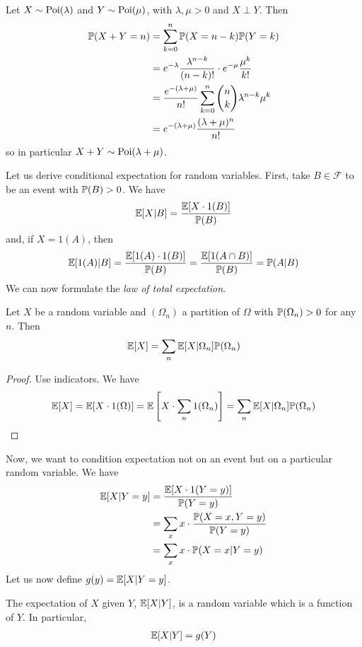 \documentclass{../template/note}
\begin{document}
    \begin{example*}
        Let \(X \sim \operatorname{Poi}(\lambda)\) and \(Y \sim \operatorname{Poi}(\mu)\), with \(\lambda, \mu > 0\) and \(X \perp Y\). Then
        \begin{align*}
            \mathbb P(X + Y = n) &= \sum_{k=0}^n \mathbb P(X = n-k)\mathbb P(Y = k) \\
            &= e^{-\lambda}\frac{\lambda^{n-k}}{(n-k)!} \cdot e^{-\mu}\frac{\mu^k}{k!} \\
            &= \frac{e^{-(\lambda+\mu)}}{n!} \sum_{k=0}^n \binom n k \lambda^{n-k} \mu^k \\
            &= e^{-(\lambda+\mu)}\frac{(\lambda+\mu)^n}{n!}
        \end{align*}
        so in particular \(X + Y \sim \operatorname{Poi}(\lambda + \mu)\).        
    \end{example*}
    Let us derive conditional expectation for random variables. First, take \(B \in \mathcal F\) to be an event with \(\mathbb P(B) > 0\). We have
    \begin{align*}
        \mathbb E[X | B] = \frac{\mathbb E[X \cdot 1(B)]}{\mathbb P(B)}
    \end{align*}
    and, if \(X = 1(A)\), then
    \begin{align*}
        \mathbb E[1(A) | B] = \frac{\mathbb E[1(A) \cdot 1(B)]}{\mathbb P(B)} = \frac{\mathbb E[1(A \cap B)]}{\mathbb P(B)} = \mathbb P(A | B)
    \end{align*}
    We can now formulate the \emph{law of total expectation}.
    \begin{proposition}
        Let \(X\) be a random variable and \((\Omega_n)\) a partition of \(\Omega\) with \(\mathbb P(\Omega_n) > 0\) for any \(n\). Then
        \begin{align*}
            \mathbb E[X] = \sum_n \mathbb E[X | \Omega_n] \mathbb P(\Omega_n)
        \end{align*}
    \end{proposition}
    \begin{proof}
        Use indicators. We have
        \begin{align*}
            \mathbb E[X] = \mathbb E[X \cdot 1(\Omega)] = \mathbb E\left[X \cdot \sum_n 1(\Omega_n)\right] = \sum_n \mathbb E[X | \Omega_n]\mathbb P(\Omega_n)
        \end{align*}
    \end{proof}
    Now, we want to condition expectation not on an event but on a particular random variable. We have
    \begin{align*}
        \mathbb E[X | Y = y] &= \frac{\mathbb E[X \cdot 1(Y=y)]}{\mathbb P(Y=y)} \\
        &= \sum_x x \cdot \frac{\mathbb P(X = x, Y = y)}{\mathbb P(Y = y)} \\
        &= \sum_x x \cdot \mathbb P(X = x | Y = y)
    \end{align*}
    Let us now define \(g(y) = \mathbb E[X | Y = y]\).
    \begin{definition}
        The expectation of \(X\) given \(Y\), \(\mathbb E[X | Y]\), is a random variable which is a function of \(Y\). In particular,
        \begin{align*}
            \mathbb E[X | Y] = g(Y)
        \end{align*}
    \end{definition}
    
\end{document}
